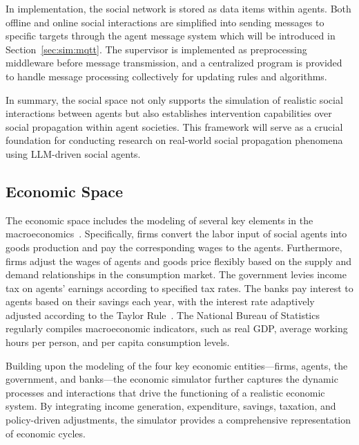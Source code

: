 In implementation, the social network is stored as data items within agents.
Both offline and online social interactions are simplified into sending messages to specific targets through the agent message system which will be introduced in Section~\ref{sec:sim:mqtt}.
The supervisor is implemented as preprocessing middleware before message transmission, and a centralized program is provided to handle message processing collectively for updating rules and algorithms.

In summary, the social space not only supports the simulation of realistic social interactions between agents but also establishes intervention capabilities over social propagation within agent societies.
This framework will serve as a crucial foundation for conducting research on real-world social propagation phenomena using LLM-driven social agents.

\subsection{Economic Space}
The economic space includes the modeling of several key elements in the macroeconomics~\cite{wolf2013multi, li2024econagent}.
Specifically, firms convert the labor input of social agents into goods production and pay the corresponding wages to the agents.
Furthermore, firms adjust the wages of agents and goods price flexibly based on the supply and demand relationships in the consumption market. 
The government levies income tax on agents' earnings according to specified tax rates.
The banks pay interest to agents based on their savings each year, with the interest rate adaptively adjusted according to the Taylor Rule~\cite{wolf2013multi}.
The National Bureau of Statistics regularly compiles macroeconomic indicators, such as real GDP, average working hours per person, and per capita consumption levels.


Building upon the modeling of the four key economic entities—firms, agents, the government, and banks—the economic simulator further captures the dynamic processes and interactions that drive the functioning of a realistic economic system. By integrating income generation, expenditure, savings, taxation, and policy-driven adjustments, the simulator provides a comprehensive representation of economic cycles.

